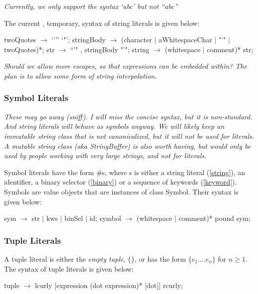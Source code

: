 \documentclass{article}
\newcommand{\code}[1]{{\sf #1}}
\begin{document}
{\it Currently, we only support  the syntax \code{`abc'} but not \code{``abc''}}

The current , temporary, syntax of string literals is given below:
\begin{newspeak}
twoQuotes $\rightarrow$   `'''   `"';    
stringBody $\rightarrow$ (character $|$ aWhitespaceChar $|$  "'" $|$ twoQuotes)*;
str $\rightarrow$  ``'" ,  stringBody   "'";
string $\rightarrow$ (whitespace $|$ comment)*  str;
\end{newspeak}

{\it 
Should we allow more escapes, so that expressions can be embedded within? The plan is to allow some form of string interpolation.

}



\subsubsection{ Symbol Literals}
\label{symbol}
{\it These may  go away (sniff). I will miss the concise syntax, but it is non-standard. And string literals will behave as symbols anyway. We will likely keep an immutable string class that is not canonicalized, but it will not be used for literals. A mutable string class (aka StringBuffer) is also  worth having, but would only be used by people working with very large strings, and not for literals.

}
Symbol literals have the form \code{\#s}, where \code{s} is either a string literal (\ref{string}), an identifier, a binary selector (\ref{binary}) or a sequence of keywords (\ref{keyword}). Symbols are value objects that are instances of class \code{Symbol}. Their syntax is given below:


\begin{newspeak}
sym $\rightarrow$ str $|$ kws $|$ binSel $|$ id;
symbol $\rightarrow$ (whitespace $|$ comment)*  pound sym;
\end{newspeak}


\subsubsection{ Tuple Literals}
\label{tuple}

A tuple literal is either the {\em empty tuple},  $\{\}$, or has the form $\{e_1 . \ldots e_n\}$ for $n \ge 1$.  
The syntax of tuple literals is given below:
\begin{newspeak}
tuple $\rightarrow$  lcurly [expression (dot expression)* [dot]]  rcurly;
\end{newspeak}
\end{document}
